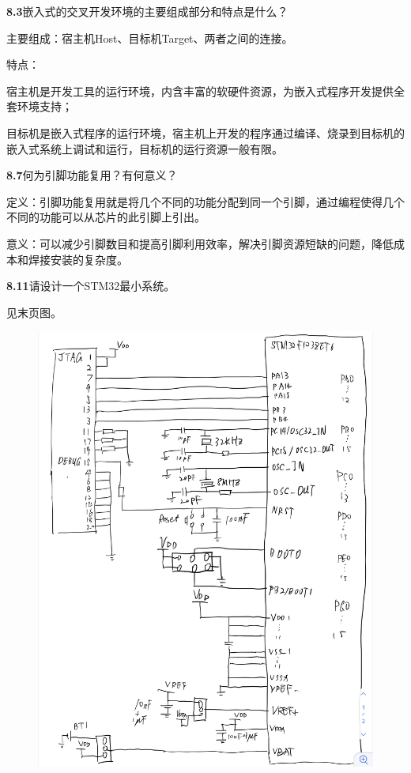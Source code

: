 \documentclass{article}
\begin{document}
    \noindent\textbf{8.3}嵌入式的交叉开发环境的主要组成部分和特点是什么？\par
    主要组成：宿主机Host、目标机Target、两者之间的连接。\par
    特点：\par
    \indent 宿主机是开发工具的运行环境，内含丰富的软硬件资源，为嵌入式程序开发提供全套环境支持；\par
    \indent 目标机是嵌入式程序的运行环境，宿主机上开发的程序通过编译、烧录到目标机的嵌入式系统上调试和运行，目标机的运行资源一般有限。
    \\[4pt]\par

    \noindent\textbf{8.7}何为引脚功能复用？有何意义？\par
    
    定义：引脚功能复用就是将几个不同的功能分配到同一个引脚，通过编程使得几个不同的功能可以从芯片的此引脚上引出。\par
    意义：可以减少引脚数目和提高引脚利用效率，解决引脚资源短缺的问题，降低成本和焊接安装的复杂度。
    \\[4pt]\par

    \noindent\textbf{8.11}请设计一个STM32最小系统。\par
    见末页图。
    \begin{figure}[h]
        \centering
        \includegraphics[scale=0.3]{1.jpeg}
    \end{figure}
    \\[4pt]\par
\end{document}
